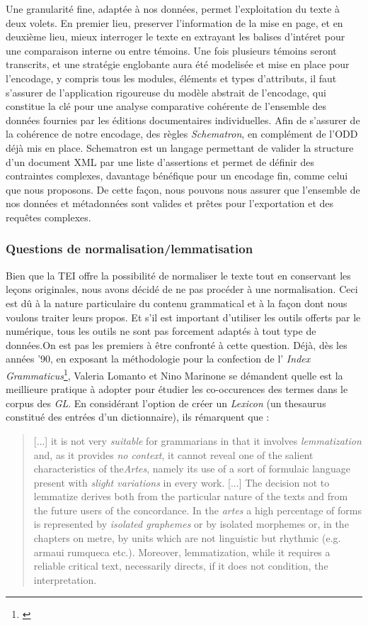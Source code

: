 \documentclass[a4paper, twoside, 12pt]{book}
\begin{document}
Une granularité fine, adaptée à nos données, permet  l'exploitation du texte à deux volets. En premier lieu, preserver l'information de la mise en page, et en deuxième lieu, mieux interroger le texte en extrayant les balises d'intéret pour une comparaison interne ou entre témoins. Une fois plusieurs témoins seront transcrits, et une stratégie englobante aura été modelisée et mise en place pour l'encodage, y compris tous les modules, éléments et types d'attributs, il faut s’assurer de l'application rigoureuse du modèle abstrait de l'encodage, qui constitue la clé pour une analyse comparative cohérente de l'ensemble des données fournies par les éditions documentaires individuelles. Afin de s'assurer de la cohérence de notre encodage, des règles \textit{Schematron}, en complément de l'ODD déjà mis en place. Schematron est un langage permettant de valider la structure d'un document XML par une liste d'assertions et permet de définir des contraintes complexes, davantage bénéfique pour un encodage fin, comme celui que nous proposons. De cette façon, nous pouvons nous assurer que l'ensemble de nos données et métadonnées sont valides et prêtes pour l'exportation et des requêtes complexes.


\subsubsection{Questions de normalisation/lemmatisation}

Bien que la TEI offre la possibilité de normaliser le texte tout en conservant les leçons originales, nous avons décidé de ne pas procéder à une normalisation. Ceci est dû à la nature particulaire du contenu grammatical et à la façon dont nous voulons traiter leurs propos. Et s'il est important d'utiliser les outils offerts par le numérique, tous les outils ne sont pas forcement adaptés à tout type de données.On est pas les premiers à être confronté à cette question. Déjà, dès les années '90, en exposant la méthodologie pour la confection de l' \textit{Index Grammaticus}\footnote{\cite{lomanto1990concordance}}, Valeria Lomanto et Nino Marinone se démandent quelle est la meillieure pratique à adopter pour étudier les co-occurences des termes dans le corpus des \textit{GL}. En considérant l'option de créer un \textit{Lexicon} (un thesaurus constitué des entrées d'un dictionnaire), ils rémarquent que : \blockquote{[...] it is not very \textit{suitable} for grammarians in that it involves \textit{lemmatization} and, as it provides \textit{no context}, it cannot reveal one of the salient characteristics of the\textit{Artes}, namely its use of a sort of formulaic language present with \textit{slight variations} in every work. [...] The decision not to lemmatize derives both from the particular nature of the texts and from the future users of the concordance. In the \textit{artes} a high percentage of forms is represented by \textit{isolated graphemes} or by isolated morphemes or, in the chapters on metre, by units which are not linguistic but rhythmic (e.g. armaui rumqueca etc.). Moreover, lemmatization, while it requires a reliable critical text, necessarily
directs, if it does not condition, the interpretation.}
\end{document}
